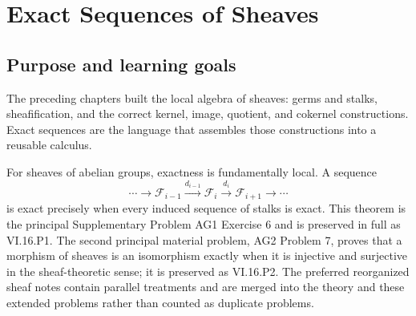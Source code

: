 
\chapter{Exact Sequences of Sheaves}
\label{ch:exact-sequences-sheaves}
\providecommand{\F}{\mathcal F}
\providecommand{\G}{\mathcal G}
\providecommand{\Hcal}{\mathcal H}
\providecommand{\Kcal}{\mathcal K}
\providecommand{\Acal}{\mathcal A}
\providecommand{\Bcal}{\mathcal B}
\providecommand{\Ccal}{\mathcal C}
\providecommand{\PreSh}{\mathbf{PreSh}}
\providecommand{\Sh}{\mathbf{Sh}}
\providecommand{\id}{\operatorname{id}}
\providecommand{\Ker}{\operatorname{Ker}}
\providecommand{\Coker}{\operatorname{Coker}}
\providecommand{\HH}{\mathcal H}

\section*{Purpose and learning goals}

The preceding chapters built the local algebra of sheaves: germs and stalks, sheafification,
and the correct kernel, image, quotient, and cokernel constructions.  Exact sequences are the
language that assembles those constructions into a reusable calculus.

For sheaves of abelian groups, exactness is fundamentally local.  A sequence
\[
\cdots\longrightarrow\F_{i-1}\xrightarrow{d_{i-1}}\F_i
\xrightarrow{d_i}\F_{i+1}\longrightarrow\cdots
\]
is exact precisely when every induced sequence of stalks is exact.  This theorem is the
principal Supplementary Problem AG1 Exercise 6 and is preserved in full as VI.16.P1.  The second
principal material problem, AG2 Problem 7, proves that a morphism of sheaves is an isomorphism
exactly when it is injective and surjective in the sheaf-theoretic sense; it is preserved as
VI.16.P2.  The preferred reorganized sheaf notes contain parallel treatments and are merged
into the theory and these extended problems rather than counted as duplicate problems.

